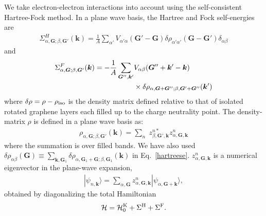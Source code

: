 \documentclass[aps,prl,reprint,amssymb,groupedaddress,twocolumn]{revtex4}
\begin{document}
We take electron-electron interactions into account using the self-consistent Hartree-Fock method.
In a plane wave basis,  the Hartree and Fock self-energies are
\begin{align}
\Sigma^{H}_{\alpha, \bm{G}; \beta, \bm{G}'}(\bm{k}) 
= \frac{1}{A} \sum_{\alpha'}
V_{\alpha'\alpha}(\bm{G}'-\bm{G}) 
\delta \rho_{\alpha'\alpha'}(\bm{G}-\bm{G}')  \delta_{\alpha\beta}
\label{hartreese}
\end{align}
and
\begin{align}
\Sigma^{F}_{\alpha, \bm{G}; \beta, \bm{G}'}(\bm{k}) 
=-\frac{1}{A}\sum_{\bm{G}'', \bm{k}'}&
V_{\alpha\beta}(\bm{G}''+\bm{k}'-\bm{k}) \notag\\
&\times\delta \rho_{\alpha, \bm{G}+\bm{G}'';\beta, \bm{G}'+\bm{G}''} (\bm{k}')
\label{fockse}
\end{align}
where $\delta\rho = \rho -\rho_{\rm{iso}}$ is the density matrix defined relative to that
of isolated rotated graphene layers each filled up to the charge neutrality point.
The density-matrix $\rho$ is defined in a plane wave basis as:
\begin{align}
\rho_{\alpha,\bm{G};\beta,\bm{G}'}(\bm{k}) = \sum_{n} \; z^{n*}_{\beta,\bm{G}',\bm{k}}z^n_{\alpha,\bm{G},\bm{k}}
\end{align}
where the summation is over filled bands. We have also used
$\delta \rho_{\alpha\beta}(\bm{G})\equiv\sum_{\bm{k},\bm{G}_1}\delta \rho_{\alpha,\bm{G}_1+\bm{G}; \beta, \bm{G}_1}(\bm{k})$
in Eq.~\ref{hartreese}.
$z_{\alpha, \bm{G},\bm{k}}^n$ is a numerical 
eigenvector in the  plane-wave expansion,
\begin{align}
|\psi_{n,\bm{k}} \rangle = \sum_{\alpha, \bm{G}} z_{\alpha, \bm{G},\bm{k}}^n |\psi_{\alpha, \bm{G}+\bm{k}}\rangle,
\end{align}
obtained by diagonalizing the total Hamiltonian
\begin{align}
\mathcal{H} = \mathcal{H}^{\rm{K}}_0 +  \Sigma^{\rm{H}} + \Sigma^{\rm{F}}.
\end{align}
\end{document}
